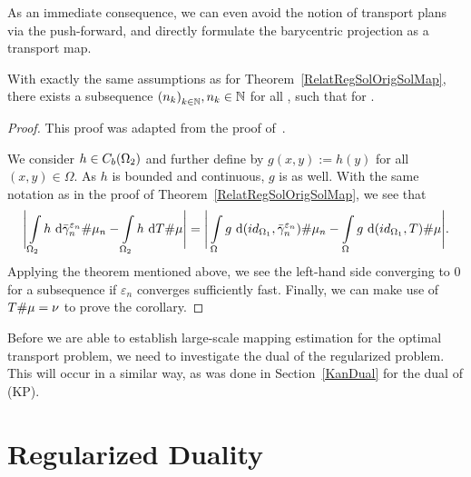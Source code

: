 As an immediate consequence, we can even avoid the notion of transport plans via the push-forward, and directly formulate the barycentric projection as a transport map.

\begin{corollary}\label{RelatRegOrigCor}
	With exactly the same assumptions as for Theorem~\ref{RelatRegSolOrigSolMap}, there exists a subsequence ${(n_k)}_{\NinN[k]}, \NinN[n_k]$ for all \NinN[k], such that  for \Ninf.
\end{corollary}

\begin{proof}
	This proof was adapted from the proof of\ \cite[Corollary~1]{Seg2018}.

	We consider $h \in \CF[b]{\Omega_2}$ and further define \map[g]{\Omega}{\R} by $g(x, y) := h(y)$ for all $(x, y) \in \Omega$. As $h$ is bounded and continuous, $g$ is as well. With the same notation as in the proof of Theorem~\ref{RelatRegSolOrigSolMap}, we see that
	\[ \Bigg\lvert \int\limits_{\Omega_2} h~\D[{\push[\bar{\gamma}_n^{\varepsilon_n}]{\mu_n}}] - \int\limits_{\Omega_2} h~\D[{\push{\mu}}] \Bigg\rvert = \Bigg\lvert \int\limits_{\Omega} g~\D[{\push[(id_{\Omega_1}, \bar{\gamma}_n^{\varepsilon_n})]{\mu_n}}] - \int\limits_{\Omega} g~\D[{\push[(id_{\Omega_1}, T)]{\mu}}] \Bigg\rvert. \]
	Applying the theorem mentioned above, we see the left-hand side converging to $0$ for a subsequence if $\varepsilon_n$ converges sufficiently fast. Finally, we can make use of $\push{\mu} = \nu$ to prove the corollary.
\end{proof}

Before we are able to establish large-scale mapping estimation for the optimal transport problem, we need to investigate the dual of the regularized problem. This will occur in a similar way, as was done in Section~\ref{KanDual} for the dual of (KP).

\section{Regularized Duality}\label{RegDual}

